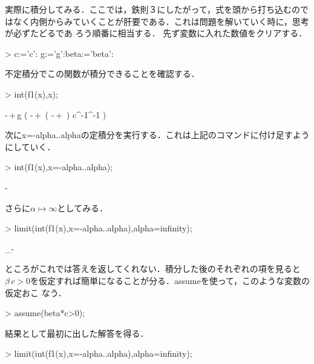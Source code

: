 実際に積分してみる．ここでは，鉄則３にしたがって，式を頭から打ち込むのではなく内側からみていくことが肝要である．これは問題を解いていく時に，思考が必ずたどるであ
ろう順番に相当する．
先ず変数に入れた数値をクリアする．
\begin{MapleInput}
> c:='c': g:='g':beta:='beta':
\end{MapleInput}
不定積分でこの関数が積分できることを確認する．
\begin{MapleInput}
> int(f1(x),x);
\end{MapleInput}
\begin{MapleOutput}
-\,{}+\beta\,g \left( -\,{}+\, \left( -\,{}+\,{} \right) {c}^{-1}{\beta}^{-1} \right)
\end{MapleOutput}

次にx=-alpha..alphaの定積分を実行する．これは上記のコマンドに付け足すようにしていく．
\begin{MapleInput}
> int(f1(x),x=-alpha..alpha);
\end{MapleInput}
\begin{MapleOutput}
-\,{}
\end{MapleOutput}
さらに$\alpha \mapsto \infty$としてみる．
\begin{MapleInput}
> limit(int(f1(x),x=-alpha..alpha),alpha=infinity);
\end{MapleInput}
\begin{MapleOutput}
\lim _{\alpha\rightarrow \infty }-\,{}
\end{MapleOutput}

ところがこれでは答えを返してくれない．積分した後のそれぞれの項を見ると$\beta \,c>0$を仮定すれば簡単になることが分る．assumeを使って，このような変数の仮定おこ
なう．
\begin{MapleInput}
> assume(beta*c>0);
\end{MapleInput}
結果として最初に出した解答を得る．
\begin{MapleInput}
> limit(int(f1(x),x=-alpha..alpha),alpha=infinity);
\end{MapleInput}
\begin{MapleOutput}
\,{}
\end{MapleOutput}

